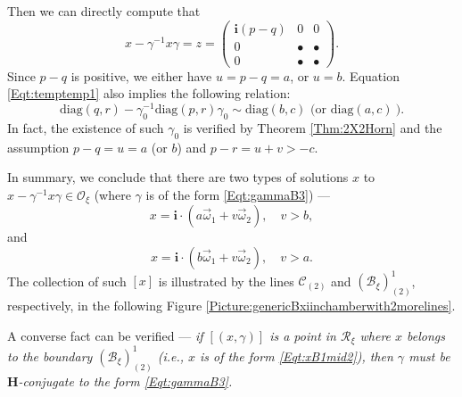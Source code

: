 \documentclass[12pt]{amsart}
\theoremstyle{definition}
\numberwithin{equation}{section}
\def\diag{\mathrm{diag}}
\newcommand{\imagunit}{\mathbf{i}}
\newcommand{\Oxi}{\mathcal{O}_{\xi}}
\newcommand{\Reducedxi}{\mathcal{R}_\xi}
\newcommand{\Bxi}{\mathcal{B}_{\xi}}
\newcommand{\Cartan}{\mathbf{H}}
\begin{document}
\begin{itemize}
Then we can directly compute that
\begin{equation}\label{Eqt:temptemp1}
 x-\gamma^{-1}x\gamma=z=\begin{pmatrix}
 \imagunit(p-q) & 0 & 0\\0 &
		\bullet     		&    \bullet\\				 0 &
		   \bullet    & \bullet   
	\end{pmatrix}.
\end{equation}
Since $p-q$ is positive, we either have $u=p-q=a$,  or $u=b$. Equation \eqref{Eqt:temptemp1} also implies the following relation:
$$
\diag(q,r)-\gamma_0^{-1}\diag(p,r)\gamma_0  \sim \diag(b,c) \mbox{ (or } \diag(a,c)~). 
$$
In fact, the existence of such $\gamma_0$ is verified by Theorem \ref{Thm:2X2Horn} and the assumption $p-q=u=a$ (or $b$) and $p-r=u+v> -c$.

In summary, we conclude that there are two types of solutions $x$ to $x-\gamma^{-1}x\gamma\in \Oxi$    (where $\gamma$ is of the form \eqref{Eqt:gammaB3}) ---  \begin{equation}\label{Eqt:xinC2}x=\imagunit\cdot (a\vec{\omega}_1+ v\vec{\omega}_2), \quad v> b, \end{equation}
and 
\begin{equation}\label{Eqt:xB1mid2}x=\imagunit\cdot (b\vec{\omega}_1+ v\vec{\omega}_2), \quad v> a. \end{equation}
The collection of such $[x]$ is illustrated by the lines $\mathcal{C}_{(2)}$ and $(\Bxi)^1_{(2)} $, respectively, in the following Figure \ref{Picture:genericBxiinchamberwith2morelines}.


A converse fact can be verified ---  \emph{if $[(x,\gamma)]$ is a point in $\Reducedxi  $ where $x$ belongs to the boundary $(\Bxi)^1_{(2)} $ (i.e., $x$ is of the form \eqref{Eqt:xB1mid2}), then $\gamma$ must be $\Cartan$-conjugate to the form \eqref{Eqt:gammaB3}. }


\end{itemize}
\end{document}
